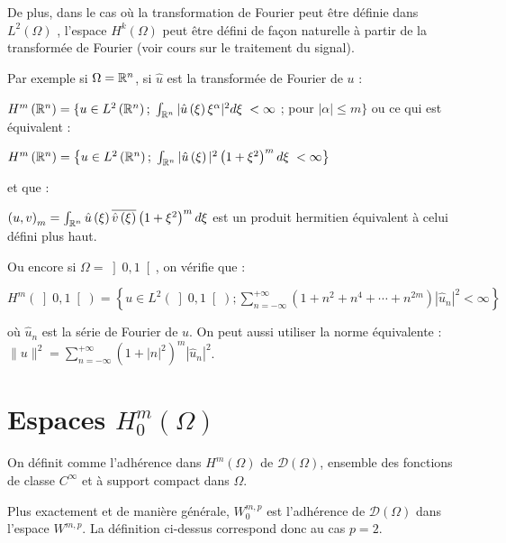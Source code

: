 \medskip
{}

\medskip{}
De plus, dans le cas où la transformation de Fourier peut être définie dans $L^{2} \left( \Omega \right)$ ,
l'espace $H^k(\Omega)$ peut être défini de façon naturelle à partir de la transformée de Fourier
(voir cours sur le traitement du signal).

Par exemple si $\Omega = \mathbb R^{n}$, si $\widehat{u}$ est la transformée de Fourier de $u$ :

$H^{m}\left( \mathbb R ^{n}\right)=\lbrace u \in L^{2}\left( \mathbb R^{n}\right);\; \int_{\mathbb R^{n}}\vert\hat{u}\left( \xi\right) \xi^{\alpha}\vert ^{2}d\xi \;<\infty\ $; pour\; $\vert\alpha\vert \leqslant m \rbrace$
ou ce qui est équivalent :

$H^{m}\left( \mathbb R ^{n}\right)=\left\lbrace u \in L^{2}\left( \mathbb R^{n}\right);\; \int_{\mathbb R^{n}}\vert\hat{u}\left( \xi\right) \vert ^{2}\left( 1+\xi^{2}\right)^{m} d\xi \;<\infty \right\rbrace$

et que :

$\left( u,v \right)_{m}=\int_{\mathbb R^{n}}\hat{u}\left(\xi \right) \overline{\hat{v}\left(\xi \right)} \left(1 + \xi^{2} \right) ^{m} d\xi$ est un produit hermitien équivalent à celui défini plus haut.

Ou encore si $\Omega =\left]0,1\right[$, on vérifie que :

$H^m(\left]0,1\right[) = \left\{ u\in L^2(\left]0,1\right[);\sum\limits_{n=-\infty}^{+\infty} (1+n^2 + n^4 + \dotsb + n^{2m}) |\widehat{u}_n|^2 < \infty \right\}$

où $\widehat{u}_n$ est la série de Fourier de $u$.
On peut aussi utiliser la norme équivalente : $\|u\|^2=\sum\limits_{n=-\infty}^{+\infty} (1 + |n|^{2})^m |\widehat{u}_n|^2$.




\medskip
\section{Espaces $H^m_0(\Omega)$}

\begin{definition}
On définit  comme l'adhérence dans $H^m(\Omega)$
de $\mathcal{D}(\Omega)$, ensemble des fonctions de classe $C^\infty$  et à support compact
dans $\Omega$.
\end{definition}
Plus exactement et de manière générale, $W^{m,p}_0$ est l'adhérence de $\mathcal{D}(\Omega)$ dans l'espace
$W^{m,p}$. La définition ci-dessus correspond donc au cas $p=2$.

